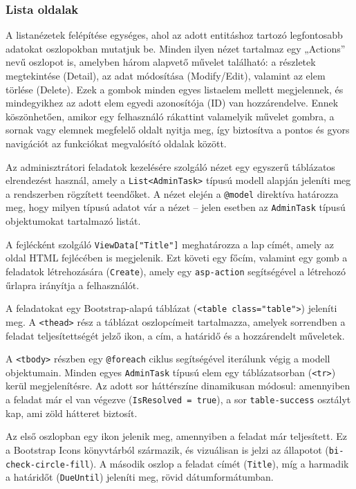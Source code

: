 \subsubsection{Lista oldalak}
A listanézetek felépítése egységes, ahol az adott entitáshoz tartozó legfontosabb adatokat oszlopokban mutatjuk be. Minden ilyen nézet tartalmaz egy „Actions” nevű oszlopot is, amelyben három alapvető művelet található: a részletek megtekintése (Detail), az adat módosítása (Modify/Edit), valamint az elem törlése (Delete). Ezek a gombok minden egyes listaelem mellett megjelennek, és mindegyikhez az adott elem egyedi azonosítója (ID) van hozzárendelve. Ennek köszönhetően, amikor egy felhasználó rákattint valamelyik művelet gombra, a sornak vagy elemnek megfelelő oldalt nyitja meg, így biztosítva a pontos és gyors navigációt az funkciókat megvalósító oldalak között.

Az adminisztrátori feladatok kezelésére szolgáló nézet egy egyszerű táblázatos elrendezést használ, amely a \texttt{List<AdminTask>} típusú modell alapján jeleníti meg a rendszerben rögzített teendőket. A nézet elején a \texttt{@model} direktíva határozza meg, hogy milyen típusú adatot vár a nézet – jelen esetben az \texttt{AdminTask} típusú objektumokat tartalmazó listát.

A fejlécként szolgáló \texttt{ViewData["Title"]} meghatározza a lap címét, amely az oldal HTML fejlécében is megjelenik. Ezt követi egy főcím, valamint egy gomb a feladatok létrehozására (\texttt{Create}), amely egy \texttt{asp-action} segítségével a létrehozó űrlapra irányítja a felhasználót.

A feladatokat egy Bootstrap-alapú táblázat (\texttt{<table class="table">}) jeleníti meg. A \texttt{<thead>} rész a táblázat oszlopcímeit tartalmazza, amelyek sorrendben a feladat teljesítettségét jelző ikon, a cím, a határidő és a hozzárendelt műveletek.

A \texttt{<tbody>} részben egy \texttt{@foreach} ciklus segítségével iterálunk végig a modell objektumain. Minden egyes \texttt{AdminTask} típusú elem egy táblázatsorban (\texttt{<tr>}) kerül megjelenítésre. Az adott sor háttérszíne dinamikusan módosul: amennyiben a feladat már el van végezve (\texttt{IsResolved = true}), a sor \texttt{table-success} osztályt kap, ami zöld hátteret biztosít.

Az első oszlopban egy ikon jelenik meg, amennyiben a feladat már teljesített. Ez a Bootstrap Icons könyvtárból származik, és vizuálisan is jelzi az állapotot (\texttt{bi-check-circle-fill}). A második oszlop a feladat címét (\texttt{Title}), míg a harmadik a határidőt (\texttt{DueUntil}) jeleníti meg, rövid dátumformátumban.

